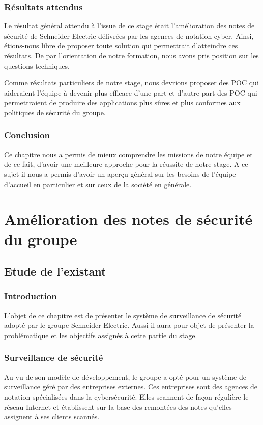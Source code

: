 \documentclass[a4paper,12pt]{book}
\theoremstyle{break}
\begin{document}
\section{Résultats attendus}
Le résultat général attendu à l'issue de ce stage était l'amélioration des notes de sécurité de Schneider-Electric délivrées par les agences de notation cyber.\newline
Ainsi, étions-nous libre de proposer toute solution qui permettrait d'atteindre ces résultats. 
De par l'orientation de notre formation, nous avons pris position sur les questions techniques. 


Comme résultats particuliers de notre stage, nous devrions proposer des POC  qui aideraient l'équipe à devenir plus efficace d'une part et d'autre part des POC qui permettraient de produire des applications plus sûres et plus conformes aux politiques de sécurité du groupe.

\section*{Conclusion}
Ce chapitre nous a permis de mieux comprendre les missions de notre équipe et de ce fait, d'avoir une meilleure approche pour la réussite de notre stage. A ce sujet il nous a permis d'avoir un aperçu général sur les besoins de l'équipe d'accueil en particulier et sur ceux de la société en générale. 


\part{Amélioration des notes de sécurité du groupe}

\chapter{Etude de l'existant}
\section*{Introduction}
L’objet de ce chapitre est de présenter le système de surveillance de sécurité adopté par le groupe Schneider-Electric. Aussi il aura pour objet de présenter la problématique et les objectifs assignés à cette partie du stage.  

\section{Surveillance de sécurité}
Au vu de son modèle de développement, le groupe a opté pour un système de surveillance géré par des entreprises externes. Ces entreprises sont des agences de notation spécialisées dans la cybersécurité. Elles scannent de façon régulière le réseau Internet et établissent sur la base des remontées des notes qu’elles assignent à ses clients scannés. 
\end{document}
